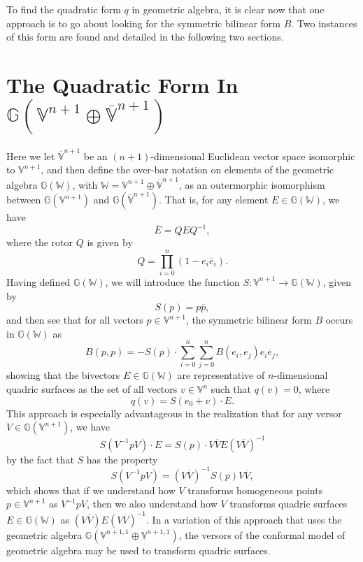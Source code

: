 \documentclass{birkjour}
\theoremstyle{definition}
\theoremstyle{remark}
\numberwithin{equation}{section}
\newcommand{\G}{\mathbb{G}}
\newcommand{\V}{\mathbb{V}}
\newcommand{\Vb}{\mathbb{\overline{V}}}
\newcommand{\W}{\mathbb{W}}
\begin{document}
To find the quadratic form $q$ in geometric algebra, it is clear now that one approach
is to go about looking for the symmetric bilinear form $B$.  Two instances of this form
are found and detailed in the following two sections.

\section{The Quadratic Form In $\G(\V^{n+1}\oplus\Vb^{n+1})$}

Here we let $\Vb^{n+1}$ be an $(n+1)$-dimensional Euclidean vector space
isomorphic to $\V^{n+1}$, and then define the over-bar notation on elements
of the geometric algebra $\G(\W)$, with $\W=\V^{n+1}\oplus\Vb^{n+1}$, as an
outermorphic isomorphism between $\G(\V^{n+1})$ and $\G(\Vb^{n+1})$.
That is, for any element $E\in\G(\W)$, we have
\begin{equation}
\overline{E} = QEQ^{-1},
\end{equation}
where the rotor $Q$ is given by
\begin{equation}
Q = \prod_{i=0}^n(1-e_i\overline{e}_i).
\end{equation}
Having defined $\G(\W)$, we will introduce the function $S:\V^{n+1}\to\G(\W)$, given by
\begin{equation}
S(p) = p\overline{p},
\end{equation}
and then see that for all vectors $p\in\V^{n+1}$, the symmetric bilinear
form $B$ occurs in $\G(\W)$ as
\begin{equation}\label{equ_quadric_transformable}
B(p,p) = -S(p)\cdot\sum_{i=0}^n\sum_{j=0}^n B(e_i,e_j)e_i\overline{e}_j,
\end{equation}
showing that the bivectors $E\in\G(\W)$ are representative of $n$-dimensional
quadric surfaces as the set of all vectors $v\in\V^n$ such that $q(v)=0$, where
\begin{equation}\label{equ_quadric_form_in_ga}
q(v)=S(e_0+v)\cdot E.
\end{equation}
This approach is especially advantageous in the realization that for
any versor $V\in\G(\V^{n+1})$, we have
\begin{equation}
S(V^{-1}pV)\cdot E=S(p)\cdot V\overline{V}E(V\overline{V})^{-1}
\end{equation}
by the fact that $S$ has the property
\begin{equation}
S(V^{-1}pV)=(V\overline{V})^{-1}S(p)V\overline{V},
\end{equation}
which shows that if we understand how $V$ transforms homogeneous
points $p\in\V^{n+1}$ as $V^{-1}pV$, then we also understand
how $V$ transforms quadric surfaces $E\in\G(\W)$ as $(V\overline{V})E(V\overline{V})^{-1}$.
In a variation of this approach that uses the geometric algebra $\G(\V^{n+1,1}\oplus\V^{n+1,1})$,
the versors of the conformal model of geometric algebra may be used to transform quadric surfaces.
\end{document}
